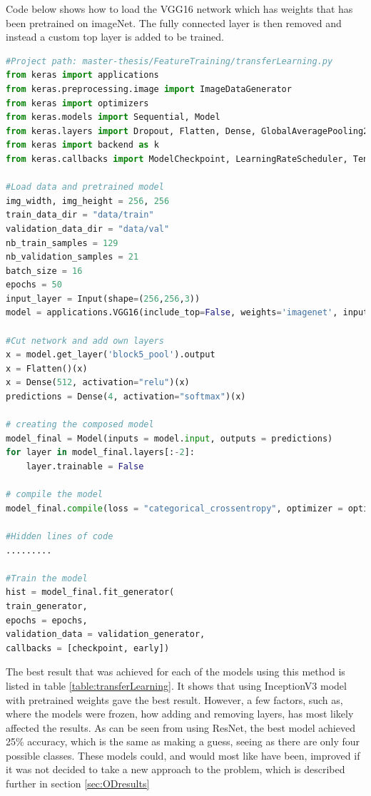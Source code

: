 Code below shows how to load the VGG16 network which has weights that has been pretrained on imageNet. The fully connected layer is then removed and instead a custom top layer is added to be trained. 
\begin{lstlisting}[language=python]
#Project path: master-thesis/FeatureTraining/transferLearning.py
from keras import applications
from keras.preprocessing.image import ImageDataGenerator
from keras import optimizers
from keras.models import Sequential, Model
from keras.layers import Dropout, Flatten, Dense, GlobalAveragePooling2D, Input, Conv2D, MaxPool2D
from keras import backend as k
from keras.callbacks import ModelCheckpoint, LearningRateScheduler, TensorBoard, EarlyStopping

#Load data and pretrained model
img_width, img_height = 256, 256
train_data_dir = "data/train"
validation_data_dir = "data/val"
nb_train_samples = 129
nb_validation_samples = 21
batch_size = 16
epochs = 50
input_layer = Input(shape=(256,256,3))
model = applications.VGG16(include_top=False, weights='imagenet', input_tensor=input_layer, pooling=None)

#Cut network and add own layers
x = model.get_layer('block5_pool').output
x = Flatten()(x)
x = Dense(512, activation="relu")(x)
predictions = Dense(4, activation="softmax")(x)

# creating the composed model
model_final = Model(inputs = model.input, outputs = predictions)
for layer in model_final.layers[:-2]:
    layer.trainable = False
    
# compile the model
model_final.compile(loss = "categorical_crossentropy", optimizer = optimizers.SGD(lr = 0.0001, momentum = 0.9), metrics=["accuracy"])

#Hidden lines of code
.........

#Train the model
hist = model_final.fit_generator(
train_generator,
epochs = epochs,
validation_data = validation_generator,
callbacks = [checkpoint, early])
\end{lstlisting}

The best result  that was achieved for each of the models using this method is listed in
 table \ref{table:transferLearning}. It shows that using InceptionV3 model with pretrained
 weights gave the best result. However, a few factors, such as, where the models were
 frozen, how adding and removing layers, has most likely affected the results. As can be
 seen from using ResNet, the best model achieved 25\% accuracy, which is the same as making a guess, seeing as there are only four possible classes. These models could, and would most like have been, improved if it was not decided to take a new approach to the problem, which is described further in section \ref{sec:ODresults}

